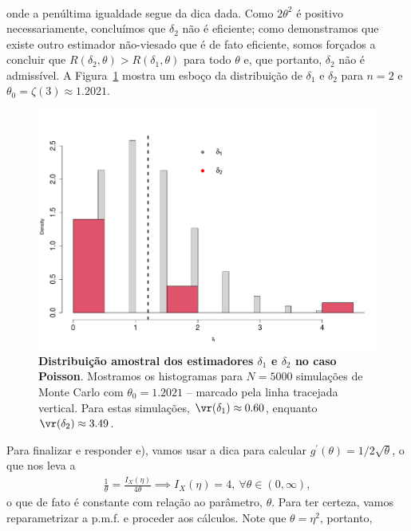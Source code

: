 {\begin{align*}
\end{align*}
onde a penúltima igualdade segue da dica dada.
Como $2\theta^2$ é positivo necessariamente, concluímos que $\delta_2$ não é eficiente; como demonstramos que existe outro estimador não-viesado que é de fato eficiente, somos forçados a concluir que $R(\delta_2, \theta) > R(\delta_1, \theta)$ para todo $\theta$ e, que portanto, $\delta_2$ não é admissível.
A Figura~\ref{fig:poisson_ests} mostra um esboço da distribuição de $\delta_1$ e $\delta_2$ para $n=2$ e $\theta_0 = \zeta(3) \approx 1.2021$.
\begin{figure}[!ht]
\begin{center}
\includegraphics[scale=0.4]{Q2_A1_2022_ests.pdf}    
\end{center}
\caption{\textbf{Distribuição amostral dos estimadores $\delta_1$ e $\delta_2$ no caso Poisson}.
Mostramos os histogramas para $N=5000$ simulações de Monte Carlo com $\theta_0 = 1.2021$ -- marcado pela linha tracejada vertical.
Para estas simulações, $\vr(\delta_1) \approx 0.60$, enquanto $\vr(\delta_2)  \approx 3.49$.
}
\label{fig:poisson_ests}
\end{figure}
Para finalizar e responder e), vamos usar a dica para calcular $g^\prime(\theta) = 1/2\sqrt{\theta}$, o que nos leva a
\begin{align*}
    \frac{1}{\theta} = \frac{I_X(\eta)}{4\theta}
    \implies I_X(\eta) = 4, \: \forall \theta \in (0, \infty),
\end{align*}
o que de fato é constante com relação ao parâmetro, $\theta$.
Para ter certeza, vamos reparametrizar a p.m.f.  e proceder aos cálculos.
Note que $\theta = \eta^2$, portanto,
\begin{equation*}

\end{equation*}}
